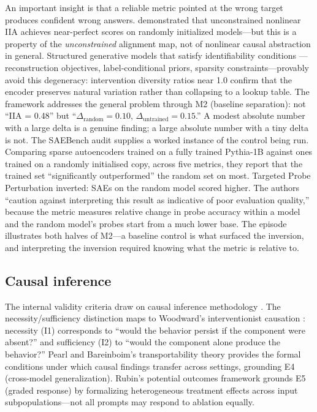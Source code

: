 \documentclass{article}
\begin{document}
An important insight is that a reliable metric pointed at the wrong target produces confident wrong answers. \citet{sutter2025nonlinear} demonstrated that unconstrained nonlinear IIA achieves near-perfect scores on randomly initialized models---but this is a property of the \emph{unconstrained} alignment map, not of nonlinear causal abstraction in general. Structured generative models that satisfy identifiability conditions \citep{khemakhem2020variational}---reconstruction objectives, label-conditional priors, sparsity constraints---provably avoid this degeneracy: intervention diversity ratios near 1.0 confirm that the encoder preserves natural variation rather than collapsing to a lookup table. The framework addresses the general problem through M2 (baseline separation): not ``IIA = 0.48'' but ``$\Delta_{\text{random}} = 0.10$, $\Delta_{\text{untrained}} = 0.15$.'' A modest absolute number with a large delta is a genuine finding; a large absolute number with a tiny delta is not. The SAEBench audit \citep{karvonen2025saebench} supplies a worked instance of the control being run. Comparing sparse autoencoders trained on a fully trained Pythia-1B against ones trained on a randomly initialised copy, across five metrics, they report that the trained set ``significantly outperformed'' the random set on most. Targeted Probe Perturbation inverted: SAEs on the random model scored higher. The authors ``caution against interpreting this result as indicative of poor evaluation quality,'' because the metric measures relative change in probe accuracy within a model and the random model's probes start from a much lower base. The episode illustrates both halves of M2---a baseline control is what surfaced the inversion, and interpreting the inversion required knowing what the metric is relative to.


\subsection{Causal inference}
\label{sec:causal}

The internal validity criteria draw on causal inference methodology \citep{pearl2009causality, spirtes2000causation}. The necessity/sufficiency distinction maps to Woodward's interventionist causation \citep{woodward2003making}: necessity (I1) corresponds to ``would the behavior persist if the component were absent?'' and sufficiency (I2) to ``would the component alone produce the behavior?'' Pearl and Bareinboim's transportability theory \citep{pearl2011transportability} provides the formal conditions under which causal findings transfer across settings, grounding E4 (cross-model generalization). Rubin's potential outcomes framework grounds E5 (graded response) by formalizing heterogeneous treatment effects across input subpopulations---not all prompts may respond to ablation equally.
\end{document}
